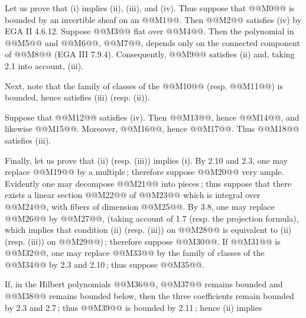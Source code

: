 Let us prove that (i) implies (ii), (iii), and (iv). Thus suppose that @@M0@@ is bounded by an invertible sheaf on an @@M1@@. Then @@M2@@ satisfies (iv) by EGA II 4.6.12. Suppose @@M3@@ flat over @@M4@@. Then the polynomial in @@M5@@ and @@M6@@, @@M7@@, depends only on the connected component of @@M8@@ (EGA III 7.9.4). Consequently, @@M9@@ satisfies (ii) and, taking 2.1 into account, (iii).

Next, note that the family of classes of the @@M10@@ (resp. @@M11@@) is bounded, hence satisfies (iii) (resp. (ii)).

Suppose that @@M12@@ satisfies (iv). Then @@M13@@, hence @@M14@@, and likewise @@M15@@. Moreover, @@M16@@, hence @@M17@@. Thus @@M18@@ satisfies (iii).

Finally, let us prove that (ii) (resp. (iii)) implies (i). By 2.10 and 2.3, one may replace @@M19@@ by a multiple\,; therefore suppose @@M20@@ very ample. Evidently one may decompose @@M21@@ into pieces\,; thus suppose that there exists a linear section @@M22@@ of @@M23@@ which is integral over @@M24@@, with fibers of dimension @@M25@@. By 3.8, one may replace @@M26@@ by @@M27@@, (taking account of 1.7 (resp. the projection formula), which implies that condition (ii) (resp. (iii)) on @@M28@@ is equivalent to (ii) (resp. (iii)) on @@M29@@)\,; therefore suppose @@M30@@. If @@M31@@ is @@M32@@, one may replace @@M33@@ by the family of classes of the @@M34@@ by 2.3 and 2.10\,; thus suppose @@M35@@.

If, in the Hilbert polynomials @@M36@@, @@M37@@ remains bounded and @@M38@@ remains bounded below, then the three coefficients remain bounded by 2.3 and 2.7\,; thus @@M39@@ is bounded by 2.11\,; hence (ii) implies
